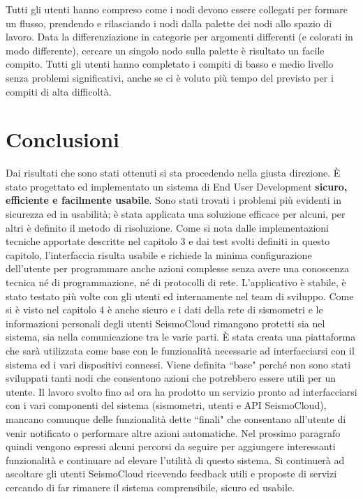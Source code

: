 \documentclass[a4paper,10pt]{memoir}
\begin{document}
Tutti gli utenti hanno compreso come i nodi devono essere collegati per formare un flusso, prendendo e rilasciando i nodi dalla palette dei nodi allo spazio di lavoro. Data la differenziazione in categorie per argomenti differenti (e colorati in modo differente), cercare un singolo nodo sulla palette è risultato un facile compito. Tutti gli utenti hanno completato i compiti di basso e medio livello senza problemi significativi, anche se ci è voluto più tempo del previsto per i compiti di alta difficoltà.

\section{Conclusioni}

Dai risultati che sono stati ottenuti si sta procedendo nella giusta direzione.
È stato progettato ed implementato un sistema di End User Development \textbf{sicuro, efficiente e facilmente usabile}.
Sono stati trovati i problemi più evidenti in sicurezza ed in usabilità; è stata applicata una soluzione efficace per alcuni, per altri è definito il metodo di risoluzione.
Come si nota dalle implementazioni tecniche apportate descritte nel capitolo 3 e dai test svolti definiti in questo capitolo, l'interfaccia risulta usabile e richiede la minima configurazione dell'utente per programmare anche azioni complesse senza avere una conoscenza tecnica né di programmazione, né di protocolli di rete.
L'applicativo è stabile, è stato testato più volte con gli utenti ed internamente nel team di sviluppo.
Come si è visto nel capitolo 4 è anche sicuro e i dati della rete di sismometri e le informazioni personali degli utenti SeismoCloud rimangono protetti sia nel sistema, sia nella comunicazione tra le varie parti.
È stata creata una piattaforma che sarà utilizzata come base con le funzionalità necessarie ad interfacciarsi con il sistema ed i vari dispositivi connessi.
Viene definita ``base" perché non sono stati sviluppati tanti nodi che consentono azioni che potrebbero essere utili per un utente.
Il lavoro svolto fino ad ora ha prodotto un servizio pronto ad interfacciarsi con i vari componenti del sistema (sismometri, utenti e API SeismoCloud), mancano comunque delle funzionalità dette ``finali" che consentano all'utente di venir notificato o performare altre azioni automatiche.
Nel prossimo paragrafo quindi vengono espressi alcuni percorsi da seguire per aggiungere interessanti funzionalità e continuare ad elevare l'utilità di questo sistema.
Si continuerà ad ascoltare gli utenti SeismoCloud ricevendo feedback utili e proposte di servizi cercando di far rimanere il sistema comprensibile, sicuro ed usabile.
\end{document}
